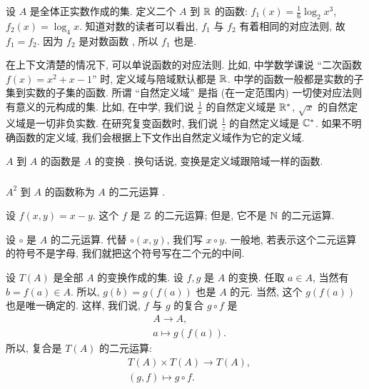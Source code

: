 \begin{example}
    设 $A$ 是全体正实数作成的集. 定义二个 $A$ 到 $\mathbb{R}$ 的函数: $f_1 (x) = \frac16 \log_{2} {x^3}$, $f_2 (x) = \log_{4} {x}$. 知道对数的读者可以看出, $f_1$ 与 $f_2$ 有着相同的对应法则, 故 $f_1 = f_2$. 因为 $f_2$ 是对数函数 , 所以 $f_1$ 也是.
\end{example}

\begin{remark}
    在上下文清楚的情况下, 可以单说函数的对应法则. 比如, 中学数学课说 ``二次函数 $f(x) = x^2 + x - 1$'' 时, 定义域与陪域默认都是 $\mathbb{R}$. 中学的函数一般都是实数的子集到实数的子集的函数. 所谓 ``自然定义域'' 是指 (在一定范围内) 一切使对应法则有意义的元构成的集. 比如, 在中学, 我们说 $\frac{1}{x}$ 的自然定义域是 $\mathbb{R}^{\ast}$, $\sqrt{x}$ 的自然定义域是一切非负实数. 在研究复变函数时, 我们说 $\frac{1}{z}$ 的自然定义域是 $\mathbb{C}^{\ast}$. 如果不明确函数的定义域, 我们会根据上下文作出自然定义域作为它的定义域.
\end{remark}

\begin{definition}
    $A$ 到 $A$ 的函数是 $A$ 的变换 . 换句话说, 变换是定义域跟陪域一样的函数.
\end{definition}

\subsubsection*{\BinaryFunctions}

\begin{definition}
    $A^2$ 到 $A$ 的函数称为 $A$ 的二元运算 .
\end{definition}

\begin{example}
    设 $f(x,y) = x-y$. 这个 $f$ 是 $\mathbb{Z}$ 的二元运算; 但是, 它不是 $\mathbb{N}$ 的二元运算.
\end{example}

\begin{remark}
    设 $\circ$ 是 $A$ 的二元运算. 代替 $\circ (x,y)$, 我们写 $x \circ y$. 一般地, 若表示这个二元运算的符号不是字母, 我们就把这个符号写在二个元的中间.
\end{remark}

\begin{definition}
    设 $T(A)$ 是全部 $A$ 的变换作成的集. 设 $f,g$ 是 $A$ 的变换. 任取 $a \in A$, 当然有 $b = f(a) \in A$. 所以, $g(b) = g(f(a))$ 也是 $A$ 的元. 当然, 这个 $g(f(a))$ 也是唯一确定的. 这样, 我们说, $f$ 与 $g$ 的复合  $g \circ f$ 是
    \begin{align*}
         & A \to A, \tag*{$g \circ f \colon$} \\
         & a \mapsto g(f(a)).
    \end{align*}
    所以, 复合是 $T(A)$ 的二元运算:
    \begin{align*}
         & T(A) \times T(A) \to T(A), \tag*{$\circ \colon$} \\
         & (g,f) \mapsto g \circ f.
    \end{align*}
\end{definition}

